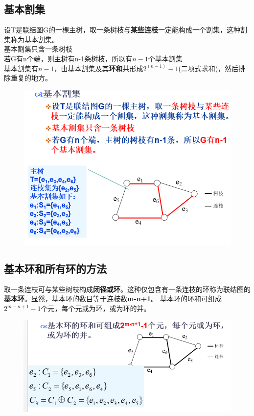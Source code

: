 \subsection{基本割集}
设T是联结图G的一棵主树，取一条树枝与\textbf{某些连枝}一定能构成一个割集，这种割集称为基本割集。\\
基本割集只含一条树枝\\
若G有n个端，则主树有n-1条树枝，所以有$ n-1 $个基本割集\\
基本割集有$ n-1 $，由基本割集及其\textbf{环和}共形成$ 2^(n-1)-1 $(二项式求和)，然后排除重复的地方。                                \begin{figure}[H]
	\centering
	\includegraphics[width=0.7\linewidth]{figures/screenshot045}
	\caption{}
	\label{fig:screenshot045}
\end{figure}
 \subsection{基本环和所有环的方法}                              
取一条连枝可与某些树枝构成\textbf{闭径或环}。这种仅包含有一条连枝的环称为联结图的\textbf{基本环}。显然，基本环的数目等于连枝数\textbf{m-n+1}。
基本环的环和可组成$ 2^{m-n+1}-1 $个元，每个元或为环，或为环的并。
\begin{figure}[H]
	\centering
	\includegraphics[width=0.7\linewidth]{figures/screenshot044}
	\caption{}
	\label{fig:screenshot044}
\end{figure}
















